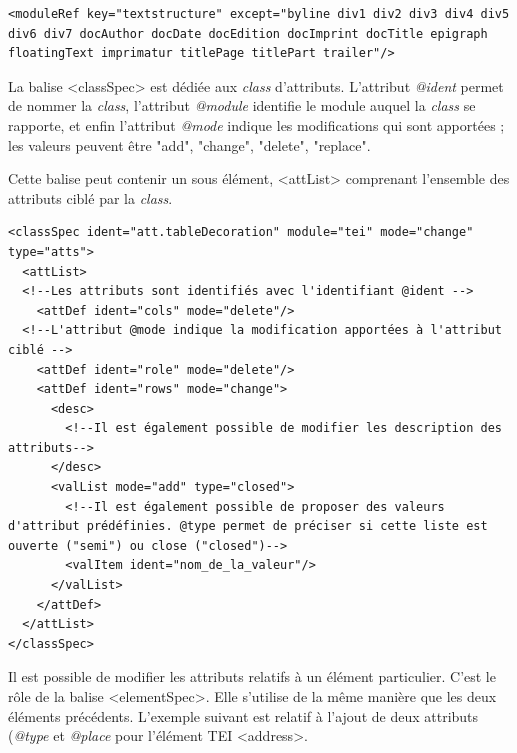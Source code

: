 \documentclass[12pt,a4paper]{book} %
\begin{document}
\begin{lstlisting}
<moduleRef key="textstructure" except="byline div1 div2 div3 div4 div5 div6 div7 docAuthor docDate docEdition docImprint docTitle epigraph floatingText imprimatur titlePage titlePart trailer"/>
\end{lstlisting}
\bigskip

La balise <classSpec> est dédiée aux \textit{class} d'attributs. L'attribut \textit{@ident} permet de nommer la \textit{class}, l'attribut \textit{@module} identifie le module auquel la \textit{class} se rapporte, et enfin l'attribut \textit{@mode} indique les modifications qui sont apportées ; les valeurs peuvent être "add", "change", "delete", "replace".

Cette balise peut contenir un sous élément, <attList> comprenant l'ensemble des attributs ciblé par la \textit{class}.
\bigskip

\begin{lstlisting}
<classSpec ident="att.tableDecoration" module="tei" mode="change" type="atts">
  <attList>
  <!--Les attributs sont identifiés avec l'identifiant @ident -->
    <attDef ident="cols" mode="delete"/>
  <!--L'attribut @mode indique la modification apportées à l'attribut ciblé -->
    <attDef ident="role" mode="delete"/>
    <attDef ident="rows" mode="change">
      <desc>
        <!--Il est également possible de modifier les description des attributs-->
      </desc>
      <valList mode="add" type="closed">
        <!--Il est également possible de proposer des valeurs d'attribut prédéfinies. @type permet de préciser si cette liste est ouverte ("semi") ou close ("closed")-->        
        <valItem ident="nom_de_la_valeur"/>
      </valList>      
    </attDef>
  </attList>
</classSpec>
\end{lstlisting}
\bigskip

Il est possible de modifier les attributs relatifs à un élément particulier. C'est le rôle de la balise <elementSpec>. 
Elle s'utilise de la même manière que les deux éléments précédents. L'exemple suivant est relatif à l'ajout de deux attributs (\textit{@type} et \textit{@place} pour l'élément TEI <address>.
\bigskip
\end{document}
